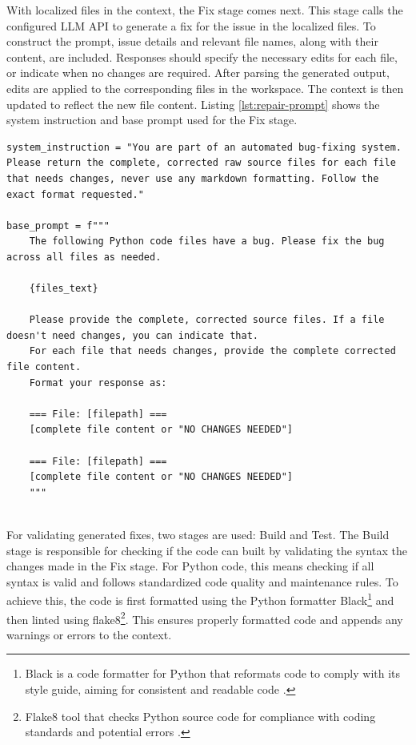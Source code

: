 With localized files in the context, the Fix stage comes next. This stage calls the configured \ac{LLM} API to generate a fix for the issue in the localized files. To construct the prompt, issue details and relevant file names, along with their content, are included. Responses should specify the necessary edits for each file, or indicate when no changes are required. After parsing the generated output, edits are applied to the corresponding files in the workspace. The context is then updated to reflect the new file content. Listing \ref{lst:repair-prompt} shows the system instruction and base prompt used for the Fix stage.

\begin{lstlisting}[style=python, caption={Repair Prompt}, label={lst:repair-prompt}]
system_instruction = "You are part of an automated bug-fixing system. Please return the complete, corrected raw source files for each file that needs changes, never use any markdown formatting. Follow the exact format requested."

base_prompt = f"""
    The following Python code files have a bug. Please fix the bug across all files as needed.

    {files_text}

    Please provide the complete, corrected source files. If a file doesn't need changes, you can indicate that.
    For each file that needs changes, provide the complete corrected file content.
    Format your response as:

    === File: [filepath] ===
    [complete file content or "NO CHANGES NEEDED"]

    === File: [filepath] ===
    [complete file content or "NO CHANGES NEEDED"]
    """
    
\end{lstlisting}

For validating generated fixes, two stages are used: Build and Test. The Build stage is responsible for checking if the code can built by validating the syntax  the changes made in the Fix stage.  For Python code, this means checking if all syntax is valid and follows standardized code quality and maintenance rules. To achieve this, the code is first formatted using the Python formatter Black\footnote{Black is a code formatter for Python that reformats code to comply with its style guide, aiming for consistent and readable code \cite{Black2510Documentation}.} and then linted using flake8\footnote{Flake8 tool that checks Python source code for compliance with coding standards and potential errors \cite{Flake8YourTool}.}. This ensures properly formatted code and appends any warnings or errors to the context.

